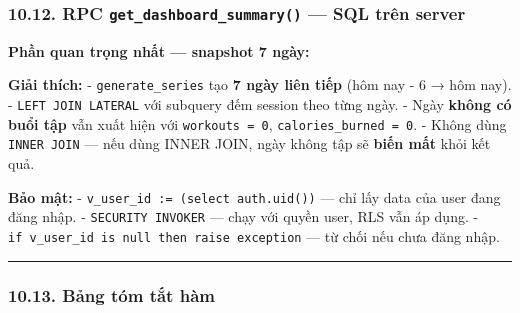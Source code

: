 \documentclass[12pt,a4paper]{article}
\begin{document}
\subsubsection{\texorpdfstring{10.12. RPC
\texttt{get\_dashboard\_summary()} --- SQL trên
server}{10.12. RPC get\_dashboard\_summary() --- SQL trên server}}\label{rpc-get_dashboard_summary-sql-truxean-server}

\textbf{Phần quan trọng nhất --- snapshot 7 ngày:}

\begin{Shaded}
\begin{Highlighting}[]
\OperatorTok{{-}}  \NormalTok{) } 
 
   \NormalTok{(}\OperatorTok{*}\NormalTok{):}  \NormalTok{, }\NormalTok{(}\NormalTok{) }
   
  \OperatorTok{=}\OperatorTok{=} \NormalTok{:}
 
\end{Highlighting}
\end{Shaded}

\textbf{Giải thích:} - \texttt{generate\_series} tạo \textbf{7 ngày liên
tiếp} (hôm nay - 6 → hôm nay). - \texttt{LEFT\ JOIN\ LATERAL} với
subquery đếm session theo từng ngày. - Ngày \textbf{không có buổi tập}
vẫn xuất hiện với \texttt{workouts\ =\ 0},
\texttt{calories\_burned\ =\ 0}. - Không dùng \texttt{INNER\ JOIN} ---
nếu dùng INNER JOIN, ngày không tập sẽ \textbf{biến mất} khỏi kết quả.

\textbf{Bảo mật:} - \texttt{v\_user\_id\ :=\ (select\ auth.uid())} ---
chỉ lấy data của user đang đăng nhập. - \texttt{SECURITY\ INVOKER} ---
chạy với quyền user, RLS vẫn áp dụng. -
\texttt{if\ v\_user\_id\ is\ null\ then\ raise\ exception} --- từ chối
nếu chưa đăng nhập.

\begin{center}\rule{0.5\linewidth}{0.5pt}\end{center}

\subsubsection{10.13. Bảng tóm tắt
hàm}\label{bux1ea3ng-tuxf3m-tux1eaft-huxe0m}
\end{document}
